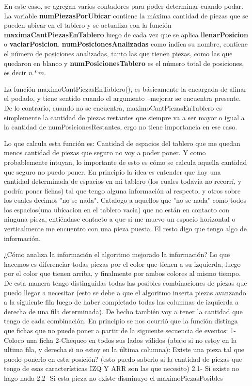 \documentclass[11pt,a4paper]{article}
\begin{document}
En este caso, se agregan varios contadores para poder determinar cuando podar. La variable \textbf{numPiezasPorUbicar} contiene la máxima cantidad de piezas que se pueden ubicar en el tablero y se actualiza con la función \textbf{maximaCantPiezasEnTablero} luego de cada vez que se aplica \textbf{llenarPosicion} o \textbf{vaciarPosicion}. \textbf{numPosicionesAnalizadas} como indica su nombre, contiene el número de posiciones analizadas, tanto las que tienen piezas, como las que quedaron en blanco y \textbf{numPosicionesTablero} es el número total de posiciones, es decir $n * m$.

La función maximoCantPiezasEnTablero(), es básicamente la encargada de afinar el podado, y tiene sentido cuando el argumento --mejorar se encuentra presente. De lo contrario, cuando no se encuentra, maximoCantPiezasEnTablero es simplemente la cantidad de piezas restantes que siempre va a ser mayor o igual a la cantidad de numPosicionesRestantes, ergo no tiene importancia en ese caso.

Lo que calcula esta función es: Cantidad de espacios del tablero que me quedan menos cantidad de piezas que seguro no voy a poder poner. Y como probablemente intuyan, lo importante de esto es cómo se calcula aquella cantidad que seguro no puedo poner. 
En principio la idea es entender que hay una cantidad determinada de espacios en mi tablero (los cuales todavía no recorrí, y podría poner fichas) tal que tengo alguna información al respecto, y otros sobre los cuales decimos "no se nada". Catalogo a aquellos que "no se nada" como todos los espacios(una ubicacion en el tablero vacia) que no están en contacto con ninguna pieza, entiéndase contacto a que si me muevo un espacio horizontal o verticalmente me encuentro con una pieza puesta. El resto digo que tengo algo de información.


¿Cómo analiza la información el algoritmo mejorado la información? Lo que hacemos es diferenciar todas piezas por el color que tienen a su izquierda, luego por el color que tienen arriba, y finalmente por ambos colores al mismo tiempo. De esta manera tengo distinguidas todas las posibles combinaciones de piezas que puedo llegar a necesitar (esto se debe a que el algoritmo inserta piezas avanzando a la siguiente fila luego de haber completado todas las columnas de izquierda a derecha de una fila determinada). De hecho también voy a tener la cantidad que tengo de cada combinación.
En principio se nos ocurrió que la función distinga que fichas que no puede poner a partir de la siguiente secuencia de eventos:
1-Coloco una ficha
2-Chequeo en todos sus lados válidos (abajo si no estoy en la ultima fila, y derecha si no estoy en la última columna): Existe una pieza tal que puedo ponerlo en esta posición? (esto puedo saberlo si la cantidad de piezas que tengo de esas características IZQ Y ARR son las que necesito)
2.1- Si existe no hago nada
2.2- Si esta pieza no existe disminuyo el maximoPiezasPosibles
\end{document}
